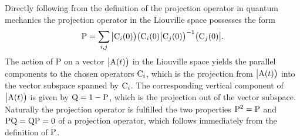 Directly following from the definition of the projection operator in quantum mechanics the projection operator in the Liouville space possesses the form
%
\begin{align}
	\mathrm{P} = \sum\limits_{i,j} \big|{\mathrm{C}_{i}(0)}\big) \big({\mathrm{C}_{i}(0)}\big|{\mathrm{C}_{j}(0)}\big)^{-1} \big({\mathrm{C}_{j}(0)}\big|.
	\label{eq:projection operator2.0}
\end{align}
%
The action of P on a vector $\big|{\mathrm{A}(t)}\big)$ in the Liouville space yields the parallel components to the chosen operators $\mathrm{C}_{i}$, which is the projection from $\big|{\mathrm{A}(t)}\big)$ into the vector subspace spanned by $\mathrm{C}_{i}$. 
The corresponding vertical component of $\big|{\mathrm{A}(t)}\big)$ is given by $\mathrm{Q} = 1- \mathrm{P}$, which is the projection out of the vector subspace.
Naturally the projection operator is fulfilled the two properties $\mathrm{P}^{2} = \mathrm{P}$ and $\mathrm{PQ} = \mathrm{QP} = 0$ of a projection operator, which follows immediately from the definition of $\mathrm{P}$.


